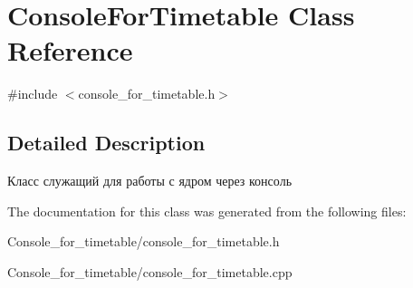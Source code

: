 \hypertarget{class_console_for_timetable}{}\section{Console\+For\+Timetable Class Reference}
\label{class_console_for_timetable}


{\ttfamily \#include $<$console\+\_\+for\+\_\+timetable.\+h$>$}



\subsection{Detailed Description}
Класс служащий для работы с ядром через консоль 

The documentation for this class was generated from the following files\+:\begin{DoxyCompactItemize}
\item 
Console\+\_\+for\+\_\+timetable/console\+\_\+for\+\_\+timetable.\+h\item 
Console\+\_\+for\+\_\+timetable/console\+\_\+for\+\_\+timetable.\+cpp\end{DoxyCompactItemize}
